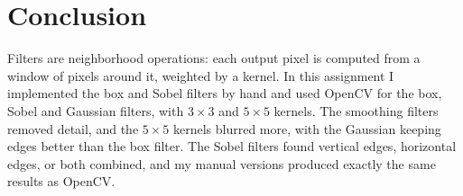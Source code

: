 \section{Conclusion}
\label{sec:conclusion}

Filters are neighborhood operations: each output pixel is computed from a window of pixels around it, weighted by a kernel. In this assignment I implemented the box and Sobel filters by hand and used OpenCV for the box, Sobel and Gaussian filters, with $3 \times 3$ and $5 \times 5$ kernels. The smoothing filters removed detail, and the $5 \times 5$ kernels blurred more, with the Gaussian keeping edges better than the box filter. The Sobel filters found vertical edges, horizontal edges, or both combined, and my manual versions produced exactly the same results as OpenCV.
